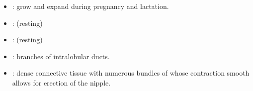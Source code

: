 \begin{multicols}{2}
\begin{itemize}
  \begin{center}
  \end{center}
  
  \item {}: grow and expand during pregnancy and lactation. 
  
  \begin{center}
  \end{center}
  
  \item {}: (resting)
  
  \begin{center}
  \end{center}
  
  \item {}: (resting)
  
  \begin{center}
  \end{center}
  
  \item {}: branches of intralobular ducts. 
  
  \begin{center}
  \end{center}
  
  \item {}: dense connective tissue with numerous bundles of whose contraction smooth allows for erection of the nipple.
  
  \begin{center}
  \end{center}
  
\end{itemize}
\end{multicols}


